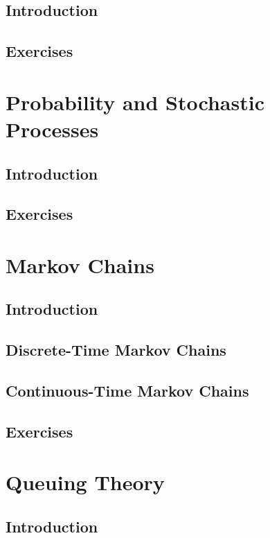 \documentclass[10pt]{book}
\begin{document}
	\chapter{Introduction}

	\chapter{Exercises}

\part{Probability and Stochastic Processes}
	\chapter{Introduction}

	\chapter{Exercises}

\part{Markov Chains}
	\chapter{Introduction}

	\chapter{Discrete-Time Markov Chains}

	\chapter{Continuous-Time Markov Chains}

	\chapter{Exercises}

\part{Queuing Theory}
	\chapter{Introduction}
\end{document}
